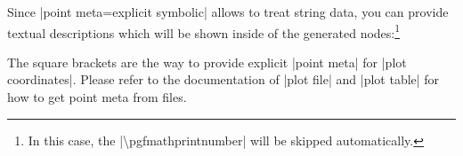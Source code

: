 {\begin{pgfplotskeylist}
    Since |point meta=explicit symbolic| allows to treat string data, you can
    provide textual descriptions which will be shown inside of the generated
    nodes:\footnote{In this case, the |\textbackslash pgfmathprintnumber| will
    be skipped automatically.}
    \label{pgfplots:example:pointmeta:nodesnearcoords}
\begin{codeexample}[]
\end{codeexample}
    The square brackets are the way to provide explicit |point meta| for
    |plot coordinates|. Please refer to the documentation of |plot file| and
    |plot table| for how to get point meta from files.


\end{pgfplotskeylist}}
